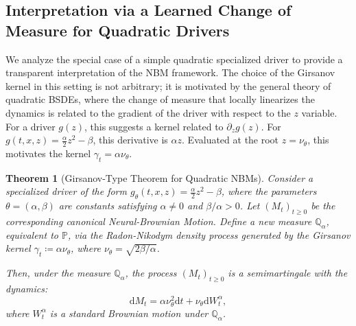 \documentclass[qian]{imsart}
\newcommand{\Qbb}{\mathbb{Q}}
\newcommand{\Prob}{\mathbb{P}}
\newcommand{\dd}{\mathrm{d}}
\theoremstyle{plain}
\newtheorem{theorem}{Theorem}[section]
\theoremstyle{definition}
\begin{document}
\subsection{Interpretation via a Learned Change of Measure for Quadratic Drivers}
\label{sec:girsanov_interpretation}
We analyze the special case of a simple quadratic specialized driver to provide a transparent interpretation of the NBM framework. The choice of the Girsanov kernel in this setting is not arbitrary; it is motivated by the general theory of quadratic BSDEs, where the change of measure that locally linearizes the dynamics is related to the gradient of the driver with respect to the $z$ variable. For a driver $g(z)$, this suggests a kernel related to $\partial_z g(z)$. For $g(t,x,z) = \frac{\alpha}{2}z^2 - \beta$, this derivative is $\alpha z$. Evaluated at the root $z=\nu_\theta$, this motivates the kernel $\gamma_t = \alpha\nu_\theta$.

\begin{theorem}[Girsanov-Type Theorem for Quadratic NBMs]
\label{thm:neural_girsanov_revised}
Consider a specialized driver of the form $g_\theta(t,x,z) = \frac{\alpha}{2}z^2 - \beta$, where the parameters $\theta=(\alpha, \beta)$ are constants satisfying $\alpha \neq 0$ and $\beta/\alpha > 0$.
Let $(M_t)_{t\ge 0}$ be the corresponding canonical Neural-Brownian Motion.
Define a new measure $\Qbb_\alpha$, equivalent to $\Prob$, via the Radon-Nikodym density process generated by the Girsanov kernel $\gamma_t \coloneqq \alpha \nu_\theta$, where $\nu_\theta = \sqrt{2\beta/\alpha}$.

Then, under the measure $\Qbb_\alpha$, the process $(M_t)_{t\ge 0}$ is a semimartingale with the dynamics:
\begin{equation}
\label{eq:nbm_drift_representation_revised}
\dd M_t = \alpha \nu_\theta^2 \dd t + \nu_\theta \dd W^{\alpha}_t,
\end{equation}
where $W^{\alpha}_t$ is a standard Brownian motion under $\Qbb_\alpha$.
\end{theorem}
\end{document}
